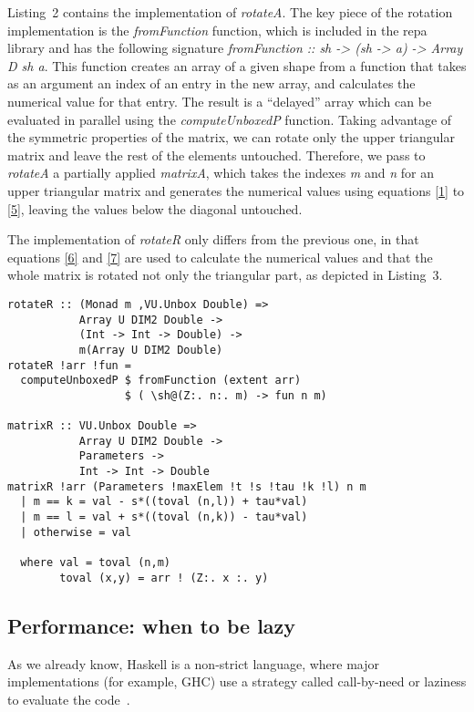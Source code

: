 \documentclass{tmr}
\begin{document}
Listing~2 contains the implementation of \textit{rotateA}.
%
The key piece of the rotation implementation is the
\textit{fromFunction} function, which is included in the repa library
and has the following signature 
\textit{fromFunction :: sh -> (sh -> a) -> Array D sh a}.
%
This function creates an array of a given shape from a function that
takes as an argument an index of an entry in the new array, and
calculates the numerical value for that entry.
%
The result is a ``delayed'' array which can be evaluated in parallel
using the \textit{computeUnboxedP} function.
%
Taking advantage of the symmetric properties of the matrix, we can
rotate only the upper triangular matrix and leave the rest of the elements untouched.
%
Therefore, we pass to \textit{rotateA} a partially applied
\textit{matrixA}, which takes the indexes \textit{m} and \textit{n} for
an upper triangular matrix and generates the numerical values using
equations \eqref{1} to \eqref{5}, leaving the values below the diagonal
untouched.

The implementation of \textit{rotateR} only differs from the previous
one, in that equations \eqref{6} and \eqref{7} are used to calculate the
numerical values and that the whole matrix is rotated not only the
triangular part, as depicted in Listing~3.

\begin{lstlisting}[float,captionpos=b,belowcaptionskip=4pt, caption= rotateR function]
rotateR :: (Monad m ,VU.Unbox Double) =>
           Array U DIM2 Double ->
           (Int -> Int -> Double) ->
           m(Array U DIM2 Double)
rotateR !arr !fun =
  computeUnboxedP $ fromFunction (extent arr)
                  $ ( \sh@(Z:. n:. m) -> fun n m)
        
matrixR :: VU.Unbox Double =>
           Array U DIM2 Double ->
           Parameters ->
           Int -> Int -> Double
matrixR !arr (Parameters !maxElem !t !s !tau !k !l) n m
  | m == k = val - s*((toval (n,l)) + tau*val)
  | m == l = val + s*((toval (n,k)) - tau*val)
  | otherwise = val

  where val = toval (n,m)
        toval (x,y) = arr ! (Z:. x :. y)
\end{lstlisting}

\subsection{Performance: when to be lazy}

As we already know, Haskell is a non-strict language, where major
implementations (for example, GHC) use a strategy called call-by-need or
laziness to evaluate the code~\cite{Laziness}.
\end{document}
